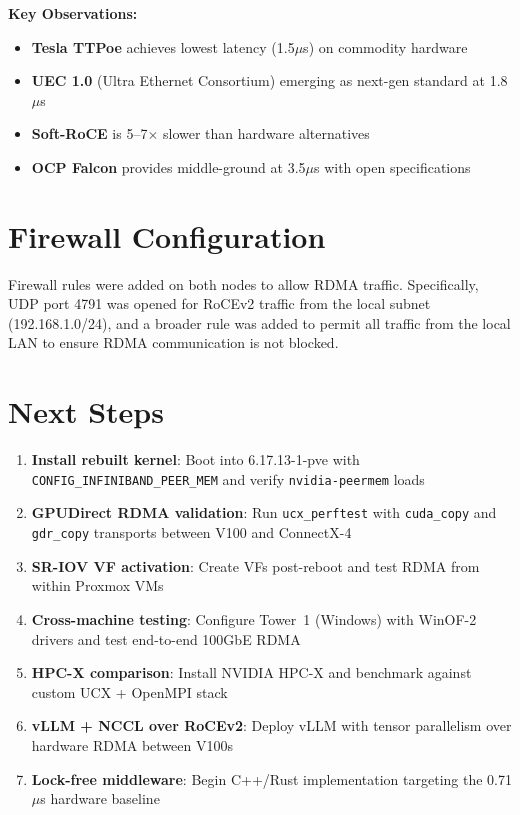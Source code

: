\documentclass[10pt,letterpaper]{article}
\begin{document}
\textbf{Key Observations:}
\begin{itemize}[noitemsep]
    \item \textbf{Tesla TTPoe} achieves lowest latency (1.5$\mu$s) on commodity hardware
    \item \textbf{UEC 1.0} (Ultra Ethernet Consortium) emerging as next-gen standard at 1.8$\mu$s
    \item \textbf{Soft-RoCE} is 5--7$\times$ slower than hardware alternatives
    \item \textbf{OCP Falcon} provides middle-ground at 3.5$\mu$s with open specifications
\end{itemize}

\section{Firewall Configuration}

Firewall rules were added on both nodes to allow RDMA traffic. Specifically, UDP port 4791 was opened for RoCEv2 traffic from the local subnet (192.168.1.0/24), and a broader rule was added to permit all traffic from the local LAN to ensure RDMA communication is not blocked.

\section{Next Steps}

\begin{enumerate}[noitemsep]
    \item \textbf{Install rebuilt kernel}: Boot into 6.17.13-1-pve with \texttt{CONFIG\_INFINIBAND\_PEER\_MEM} and verify \texttt{nvidia-peermem} loads
    \item \textbf{GPUDirect RDMA validation}: Run \texttt{ucx\_perftest} with \texttt{cuda\_copy} and \texttt{gdr\_copy} transports between V100 and ConnectX-4
    \item \textbf{SR-IOV VF activation}: Create VFs post-reboot and test RDMA from within Proxmox VMs
    \item \textbf{Cross-machine testing}: Configure Tower~1 (Windows) with WinOF-2 drivers and test end-to-end 100GbE RDMA
    \item \textbf{HPC-X comparison}: Install NVIDIA HPC-X and benchmark against custom UCX + OpenMPI stack
    \item \textbf{vLLM + NCCL over RoCEv2}: Deploy vLLM with tensor parallelism over hardware RDMA between V100s
    \item \textbf{Lock-free middleware}: Begin C++/Rust implementation targeting the 0.71$\mu$s hardware baseline
\end{enumerate}
\end{document}
